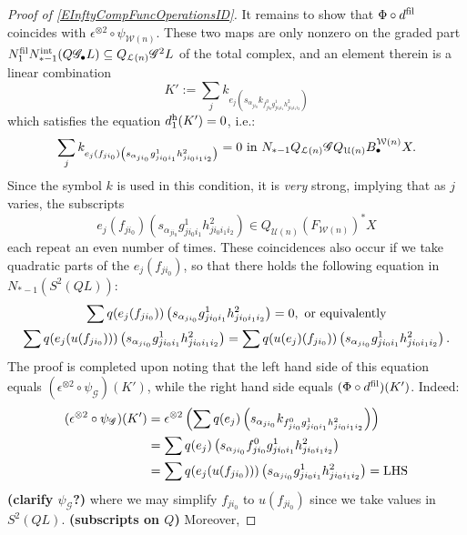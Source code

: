 \documentclass[11pt]{amsart}
\theoremstyle{plain}
\theoremstyle{definition}
\newcommand{\scrQ}{\mathscr{Q}}
\newcommand{\scrR}{\mathscr{R}}
\newcommand{\scrT}{\mathscr{T}}
\newcommand{\scrY}{\mathscr{Y}}
\newcommand{\scrI}{\mathscr{I}}
\newcommand{\scrO}{\mathscr{O}}
\newcommand{\scrP}{\mathscr{P}}
\newcommand{\scrS}{\mathscr{S}}
\newcommand{\scrG}{\mathscr{G}}
\newcommand{\scrH}{\mathscr{H}}
\newcommand{\scrJ}{\mathscr{J}}
\newcommand{\scrK}{\mathscr{K}}
\newcommand{\scrL}{\mathscr{L}}
\newcommand{\scrZ}{\mathscr{Z}}
\newcommand{\scrN}{\mathscr{N}}
\newcommand{\scrM}{\mathscr{M}}
\newcommand{\calW}{\mathcal{W}}
\newcommand{\calU}{\mathcal{U}}
\newcommand{\calL}{\mathcal{L}}
\theoremstyle{plain}
\newcommand{\BSW}{{\scrG}}%
\newcommand{\BSWres}{{\scrG_\bullet}}
\begin{document}
\begin{Composite functor spectral sequences}
\begin{proof}[Proof of \ref{EInftyCompFuncOperationsID}]
It remains to show that $\Phi\circ d^\textup{fil}$ coincides with $\epsilon^{\otimes 2}\circ\psi_{\calW(n)}$. These two maps are only nonzero on the graded part $N_1^\textup{fil}N_{*-1}^\textup{int}(Q\BSWres L)\subseteq Q_{\calL(n)}\BSW^2 L$ of the total complex, and an element therein is a linear combination
\[K':=\sum_j k_{e_j\left(s_{\alpha_{ji_0}} k_{f^0_{ji_0}g^1_{ji_0i_1}h^2_{ji_0i_1i_2}}\right)}\]
which satisfies the equation $d_1^\textup{h}(K')=0$, i.e.:
\[\sum_j k_{e_j(f_{ji_0})\left(s_{\alpha_{ji_0}} {g^1_{ji_0i_1}h^2_{ji_0i_1i_2}}\right)}=0\textup{ in }N_{*-1}Q_{\calL(n)}\BSW Q_{\calU(n)}B_\bullet^{\calW(n)}X.\]
Since the symbol $k$ is used in this condition, it is \emph{very} strong, implying that as $j$ varies, the subscripts 
\[e_j(f_{ji_0})\left(s_{\alpha_{ji_0}} {g^1_{ji_0i_1}h^2_{ji_0i_1i_2}}\right)\in Q_{\calU(n)}(F_{\calW(n)})^*X\]
each repeat an even number of times. %
These coincidences also occur if we take quadratic parts of the $e_j(f_{ji_0})$, so that there holds the following equation in $N_{*-1}(S^2(QL))$:
\begin{gather*}
\sum q(e_j(f_{ji_0}))\left(s_{\alpha_{ji_0}} {g^1_{ji_0i_1}h^2_{ji_0i_1i_2}}\right)=0,\textup{ or equivalently}\\
\sum q(e_j(u(f_{ji_0})))\left(s_{\alpha_{ji_0}} {g^1_{ji_0i_1}h^2_{ji_0i_1i_2}}\right)
=
\sum q(u(e_j)(f_{ji_0}))\left(s_{\alpha_{ji_0}} {g^1_{ji_0i_1}h^2_{ji_0i_1i_2}}\right).
\end{gather*}
The proof is completed upon noting that the left hand side of this equation equals $(\epsilon^{\otimes 2}\circ \psi_{\BSW})(K')$, while the right hand side equals $(\Phi\circ d^\textup{fil})(K')$. Indeed:
\begin{alignat*}{2}
(\epsilon^{\otimes 2}\circ \psi_{\BSW})(K')
&=
\epsilon^{\otimes 2}\left(\sum q(e_j)\left(s_{\alpha_{ji_0}} k_{f^0_{ji_0}g^1_{ji_0i_1}h^2_{ji_0i_1i_2}}\right)\right)%
\\
&=
\sum q(e_j)\left(s_{\alpha_{ji_0}} f^0_{ji_0}g^1_{ji_0i_1}h^2_{ji_0i_1i_2}\right)%
\\
&=
\sum q(e_j(u(f_{ji_0})))\left(s_{\alpha_{ji_0}} g^1_{ji_0i_1}h^2_{ji_0i_1i_2}\right)=\textup{LHS}
\end{alignat*}
\textbf{(clarify $\psi_{\BSW}$?)} where we may simplify $f_{ji_0}$ to $u(f_{ji_0})$ since we take values in $S^2(QL)$. \textbf{(subscripts on $Q$)} Moreover,

\end{proof}
\end{Composite functor spectral sequences}
\end{document}
